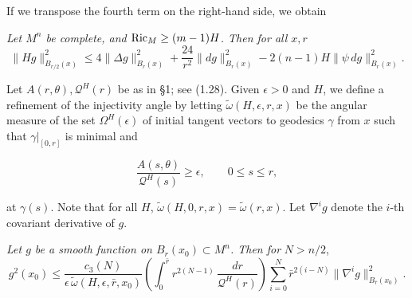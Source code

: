 If we transpose the fourth term on the right-hand side, we obtain

\begin{proposition}
\label{prop:coercive-hessian-estimate}
\textit{Let $M^n$ be complete, and $\operatorname{Ric}_M \geq (m-1)H$. Then for all $x, r$}
\begin{equation}\tag{2.43}
\|Hg\|^2_{B_{r/2}(x)} \le 4\|\Delta g\|^2_{B_r(x)} + \frac{24}{r^2}\|dg\|^2_{B_r(x)}
- 2(n-1)H\|\psi\,dg\|^2_{B_r(x)}.
\end{equation}
\end{proposition}

Let $A(r,\theta), \mathcal{Q}^H(r)$ be as in \S1; see (1.28). Given $\epsilon > 0$ and $H$, we define a refinement of the injectivity angle by letting $\widetilde{\omega}(H,\epsilon,r,x)$ be the angular
measure of the set $\Omega^H(\epsilon)$ of initial tangent vectors to geodesics $\gamma$ from $x$ such
that $\gamma|_{[0,r]}$ is minimal and

\begin{equation}\tag{2.44}
\frac{A(s,\theta)}{\mathcal{Q}^H(s)} \ge \epsilon,\qquad 0 \le s \le r,
\end{equation}

at $\gamma(s)$. Note that for all $H$, $\widetilde{\omega}(H,0,r,x)=\widetilde{\omega}(r,x)$. Let $\nabla^i g$ denote the $i$-th
covariant derivative of $g$.

\begin{proposition}
\label{prop:pointwise-sobolev-estimate}
\textit{Let $g$ be a smooth function on $B_r(x_0)\subset M^n$. Then for}
$N>n/2$,
\begin{equation}\tag{2.45}
g^2(x_0)\le \frac{c_3(N)}{\epsilon\,\widetilde{\omega}(H,\epsilon,\bar r,x_0)}
\left(\int_0^{\bar r} r^{2(N-1)}\,\frac{dr}{\mathcal{Q}^H(r)}\right)
\sum_{i=0}^N \bar r^{2(i-N)}\|\nabla^i g\|^2_{B_{\bar r}(x_0)}.
\end{equation}
\end{proposition}

